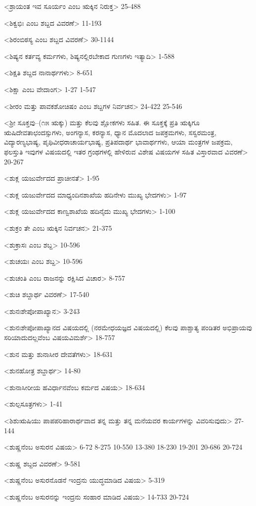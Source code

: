 <ಶ್ರಾಯಂತ ಇವ ಸೂರ್ಯಂ ಎಂಬ ಋಕ್ಕಿನ ನಿರುಕ್ತ>
25-488

<ಶಿಕ್ವಭಿಃ ಎಂಬ ಶಬ್ದದ ವಿವರಣೆ>
11-193

<ಶಿರಂಬಿಠಸ್ಯ ಎಂಬ ಶಬ್ದದ ವಿವರಣೆ>
30-1144

<ಶಿಷ್ಯನ ಕರ್ತವ್ಯ ಕರ್ಮಗಳು, ಶಿಷ್ಯನಲ್ಲಿರಬೇಕಾದ ಗುಣಗಳು ಇತ್ಯಾದಿ>
1-588

<ಶಿಕ್ಷತಿ ಶಬ್ದದ ನಾನಾರ್ಥಗಳು>
8-651

<ಶಿಕ್ಷಾ ಎಂಬ ವೇದಾಂಗ>
1-27
1-547

<ಶೀರಂ ಮತ್ತು ಪಾವಕಶೋಚಿಷಂ ಎಂಬ ಶಬ್ದಗಳ ನಿರ್ವಚನ>
24-422
25-546

<ಶ್ರೀ ಸೂಕ್ತವು–(೧೫ ಋಕ್ಕು) ಮತ್ತು ಕೆಲವು ಶ್ಲೋಕಗಳು ಸಹಿತ. ಈ ಸೂಕ್ತಕ್ಕೆ ಪ್ರತಿ ಋಕ್ಕಿಗೂ ಋಷಿದೇವತಾಛಂದಸ್ಸುಗಳು, ಅಂಗನ್ಯಾಸ, ಕರನ್ಯಾಸ, ಧ್ಯಾನ ಮೊದಲಾದ ಜಪಕ್ರಮಗಳು, ಸಸ್ವರಮಂತ್ರ, ವಿದ್ಯಾರಣ್ಯಭಾಷ್ಯ, ಪೃಥಿವೀಧರಾಚಾರ್ಯಭಾಷ್ಯ, ಪ್ರತಿಪದಾರ್ಥ ಭಾವಾರ್ಥಗಳು, ಆಯಾ ಮಂತ್ರಗಳ ಜಪಕ್ರಮ, ಫಲಸ್ತುತಿ ಇವುಗಳ ವಿಷಯದಲ್ಲಿ ಇತರ ಗ್ರಂಥಗಳಲ್ಲಿ ಹೇಳಿರುವ ವಿಶೇಷ ವಿಷಯಗಳ ಸಹಿತ ವಿಸ್ತಾರವಾದ ವಿವರಣೆ>
20-267

<ಶುಕ್ಲ ಯಜುರ್ವೇದದ ಪ್ರಾಚೀನತೆ>
1-95

<ಶುಕ್ಲ ಯಜುರ್ವೇದದ ಮಾಧ್ಯಂದಿನಶಾಖೆಯ ಹದಿನೇಳು ಮುಖ್ಯ ಭೇದಗಳು>
1-97

<ಶುಕ್ಲ ಯಜುರ್ವೇದದ ಕಾಣ್ವಶಾಖೆಯ ಹದಿನೈದು ಮುಖ್ಯ ಭೇದಗಳು>
1-100

<ಶುಕ್ರಂ ತೇ ಎಂಬ ಋಕ್ಕಿನ ನಿರ್ವಚನ>
21-375

<ಶುಕ್ರಾಸಃ ಎಂಬ ಶಬ್ದ>
10-596

<ಶುಚಯಃ ಎಂಬ ಶಬ್ದ>
10-596

<ಶುಚಂತಿ ಎಂಬ ರಾಜನನ್ನು ರಕ್ಷಿಸಿದ ವಿಚಾರ>
8-757

<ಶುಚಿ ಶಬ್ದಾರ್ಥ ವಿವರಣೆ>
17-540

<ಶುನಃಶೇಪೋಪಾಖ್ಯಾನ>
3-243

<ಶುನಃಶೇಪೋಪಾಖ್ಯಾನದ ವಿಷಯದಲ್ಲಿ (ನರಮೇಧಯಜ್ಞದ ವಿಷಯದಲ್ಲಿ) ಕೆಲವು ಪಾಶ್ಚಾತ್ಯ ಪಂಡಿತರ ಅಭಿಪ್ರಾಯವು ಸರಿಯಾದುದಲ್ಲವೆಂಬ ವಿಷಯವಿಮರ್ಶೆ>
18-757

<ಶುನ ಮತ್ತು ಶುನಾಸೀರ ದೇವತೆಗಳು>
18-631

<ಶುನಹೋತ್ರ ಶಬ್ದಾರ್ಥ>
14-80

<ಶುನಾಸೀರೀಯ ಹವಿರ್ಧಾನವೆಂಬ ಕರ್ಮದ ವಿಷಯ>
18-634

<ಶುಲ್ಪಸೂತ್ರಗಳು>
1-41

<ಶಿಶುಋಷಿಯು ಪಾಪಪರಿಹಾರಾರ್ಥವಾದ ತನ್ನ ಮತ್ತು ತನ್ನ ಮನೆಯವರ ಕಾರ್ಯಗಳನ್ನು ವಿವರಿಸುವುದು>
27-144

<ಶುಷ್ಣನೆಂಬ ಅಸುರನ ವಿಷಯ>
6-72
8-275 
10-550 
13-380
18-230
19-201
20-686
20-724


<ಶುಷ್ಣ ಶಬ್ದದ ವಿವರಣೆ>
9-581


<ಶುಷ್ಣನೆಂಬ ಅಸುರನೊಡನೆ ಇಂದ್ರನು ಯುದ್ಧಮಾಡಿದ ವಿಷಯ>
5-319

<ಶುಷ್ಣನೆಂಬ ಅಸುರನನ್ನು ಇಂದ್ರನು ಸಂಹಾರ ಮಾಡಿದ ವಿಷಯ>
14-733
20-724

